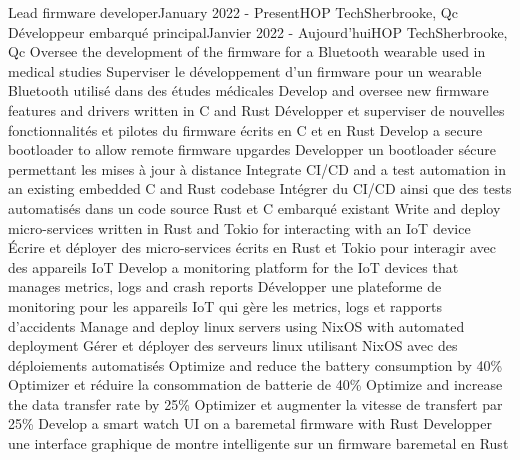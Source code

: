   \resumeSubHeadingListStart
      \resumeSubheadingEnFr
        {Lead firmware developer}{January 2022 - Present}{HOP Tech}{Sherbrooke, Qc}
        {Développeur embarqué principal}{Janvier 2022 - Aujourd'hui}{HOP Tech}{Sherbrooke, Qc}
            \resumeItemListStart
                \resumeItemEnFr
                    {Oversee the development of the firmware for a Bluetooth wearable used in medical studies}
                    {Superviser le développement d'un firmware pour un wearable Bluetooth utilisé dans des études médicales}
                \resumeItemEnFr
                    {Develop and oversee new firmware features and drivers written in C and Rust}
                    {Développer et superviser de nouvelles fonctionnalités et pilotes du firmware écrits en C et en Rust}
                \resumeItemEnFr
                    {Develop a secure bootloader to allow remote firmware upgardes}
                    {Developper un bootloader sécure permettant les mises à jour à distance}
                \resumeItemEnFr
                    {Integrate CI/CD and a test automation in an existing embedded C and Rust codebase}
                    {Intégrer du CI/CD ainsi que des tests automatisés dans un code source Rust et C embarqué existant}
                \resumeItemEnFr
                    {Write and deploy micro-services written in Rust and Tokio for interacting with an IoT device}
                    {Écrire et déployer des micro-services écrits en Rust et Tokio pour interagir avec des appareils IoT}
                \resumeItemEnFr
                    {Develop a monitoring platform for the IoT devices that manages metrics, logs and crash reports}
                    {Développer une plateforme de monitoring pour les appareils IoT qui gère les metrics, logs et rapports d'accidents}
                \resumeItemEnFr
                    {Manage and deploy linux servers using NixOS with automated deployment}
                    {Gérer et déployer des serveurs linux utilisant NixOS avec des déploiements automatisés}
                \resumeItemEnFr
                    {Optimize and reduce the battery consumption by 40\%}
                    {Optimizer et réduire la consommation de batterie de 40\%}
                \resumeItemEnFr
                    {Optimize and increase the data transfer rate by 25\%}
                    {Optimizer et augmenter la vitesse de transfert par 25\%}
                \resumeItemEnFr
                    {Develop a smart watch UI on a baremetal firmware with Rust}
                    {Developper une interface graphique de montre intelligente sur un firmware baremetal en Rust}
